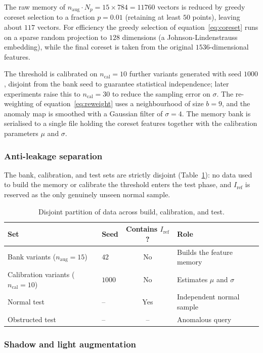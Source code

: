 The raw memory of $n_{\mathrm{aug}} \cdot N_p = 15 \times 784 = 11760$ vectors is
reduced by greedy coreset selection to a fraction $p = 0.01$ (retaining at least
$50$ points), leaving about $117$ vectors. For efficiency the greedy selection
of equation~\eqref{eq:coreset} runs on a sparse random projection to $128$
dimensions (a Johnson-Lindenstrauss embedding), while the final coreset is taken
from the original $1536$-dimensional features.

The threshold is calibrated on $n_{\mathrm{cal}} = 10$ further variants generated
with seed $1000$, disjoint from the bank seed to guarantee statistical
independence; later experiments raise this to $n_{\mathrm{cal}} = 30$ to reduce
the sampling error on $\sigma$. The re-weighting of equation~\eqref{eq:reweight}
uses a neighbourhood of size $b = 9$, and the anomaly map is smoothed with a
Gaussian filter of $\sigma = 4$. The memory bank is serialised to a single file
holding the coreset features together with the calibration parameters $\mu$ and
$\sigma$.

\subsubsection{Anti-leakage separation}

The bank, calibration, and test sets are strictly disjoint
(Table~\ref{tab:p3-leakage}): no data used to build the memory or calibrate the
threshold enters the test phase, and $I_{\mathrm{ref}}$ is reserved as the only
genuinely unseen normal sample.

\begin{table}[h]
  \centering
  \begin{tabular}{llcl}
    \hline
    Set & Seed & Contains $I_{\mathrm{ref}}$? & Role \\
    \hline
    Bank variants ($n_{\mathrm{aug}}=15$) & $42$ & No & Builds the feature memory \\
    Calibration variants ($n_{\mathrm{cal}}=10$) & $1000$ & No & Estimates $\mu$ and $\sigma$ \\
    Normal test & -- & Yes & Independent normal sample \\
    Obstructed test & -- & -- & Anomalous query \\
    \hline
  \end{tabular}
  \caption{Disjoint partition of data across build, calibration, and test.}
  \label{tab:p3-leakage}
\end{table}

\subsubsection{Shadow and light augmentation}

